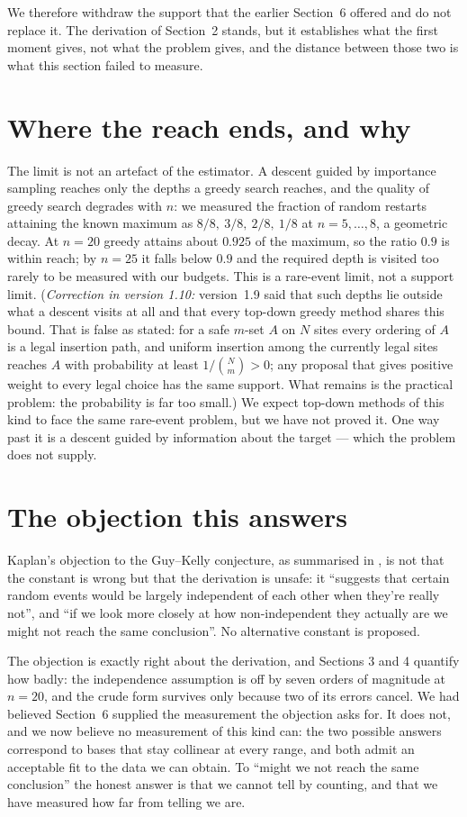 \documentclass[11pt,a4paper]{article}
\begin{document}
We therefore withdraw the support that the earlier Section~6 offered and do not replace it.  The
derivation of Section~2 stands, but it establishes what the first moment gives, not what the
problem gives, and the distance between those two is what this section failed to measure.

\section{Where the reach ends, and why}
The limit is not an artefact of the estimator.  A descent guided by importance sampling reaches
only the depths a greedy search reaches, and the quality of greedy search degrades with $n$: we
measured the fraction of random restarts attaining the known maximum as $8/8,\ 3/8,\ 2/8,\ 1/8$
at $n=5,\dots,8$, a geometric decay.  At $n=20$ greedy attains about $0.925$ of the maximum, so
the ratio $0.9$ is within reach; by $n=25$ it falls below $0.9$ and the required depth is visited too rarely to be measured
with our budgets.  This is a rare-event limit, not a support limit.  (\emph{Correction in version 1.10:}
version~1.9 said that such depths lie outside what a descent visits at all and that every
top-down greedy method shares this bound.  That is false as stated: for a safe $m$-set $A$ on $N$
sites every ordering of $A$ is a legal insertion path, and uniform insertion among the currently
legal sites reaches $A$ with probability at least $1/\binom{N}{m}>0$; any proposal that gives positive
weight to every legal choice has the same support.  What remains is the practical problem: the
probability is far too small.)  We expect top-down methods of this kind to face the same rare-event
problem, but we have not proved it.  One way past it is a descent guided by information about the
target --- which the problem does not supply.

\section{The objection this answers}
Kaplan's objection to the Guy--Kelly conjecture, as summarised in \cite{Kaplan}, is not that the
constant is wrong but that the derivation is unsafe: it ``suggests that certain random events would
be largely independent of each other when they're really not'', and ``if we look more closely at
how non-independent they actually are we might not reach the same conclusion''.  No alternative
constant is proposed.

The objection is exactly right about the derivation, and Sections 3 and 4 quantify how badly:
the independence assumption is off by seven orders of magnitude at $n=20$, and the crude form
survives only because two of its errors cancel.  We had believed Section~6 supplied the
measurement the objection asks for.  It does not, and we now believe no measurement of this kind
can: the two possible answers correspond to bases that stay collinear at every range, and both
admit an acceptable fit to the data we can obtain.  To ``might we not reach the same conclusion''
the honest answer is that we cannot tell by counting, and that we have measured how far from
telling we are.
\end{document}

